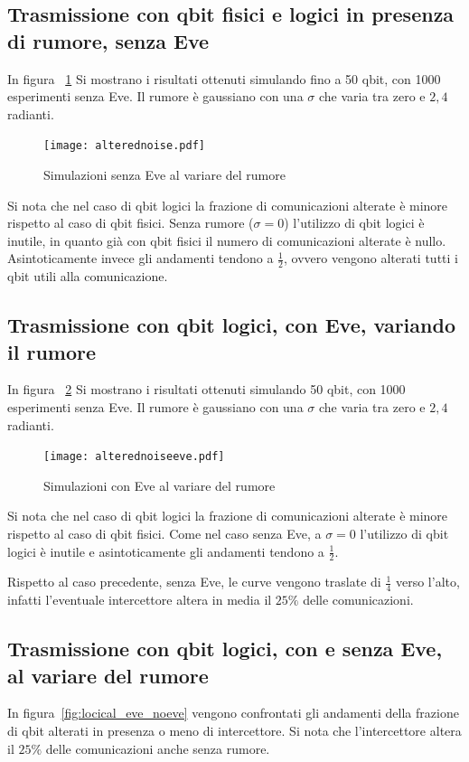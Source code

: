 \documentclass[11 pt, a4paper]{article}
\begin{document}
\clearpage
\subsection{Trasmissione con qbit fisici e logici in presenza di rumore, senza Eve}

In figura ~\ref{fig:alteredvsnoise} Si mostrano i risultati ottenuti simulando fino a 50 qbit, con 1000 esperimenti senza Eve.
Il rumore è gaussiano con una $\sigma$ che varia tra zero e $2,4$ radianti.

\begin{figure}[htb!]
\centering
\texttt{[image: alterednoise.pdf]}
\caption{Simulazioni senza Eve al variare del rumore}
\label{fig:alteredvsnoise}
\end{figure}

Si nota che nel caso di qbit logici la frazione di comunicazioni alterate è minore rispetto al caso di qbit fisici.
Senza rumore ($\sigma=0$) l'utilizzo di qbit logici è inutile, in quanto già con qbit fisici il numero di comunicazioni alterate è nullo.
Asintoticamente invece gli andamenti tendono a $\frac{1}{2}$, ovvero vengono alterati tutti i qbit utili alla comunicazione.

\clearpage
\subsection{Trasmissione con qbit logici, con Eve, variando il rumore}
In figura ~\ref{fig:alteredvsnoiseeve} Si mostrano i risultati ottenuti simulando 50 qbit, con 1000 esperimenti senza Eve.
Il rumore è gaussiano con una $\sigma$ che varia tra zero e $2,4$ radianti.

\begin{figure}[htb!]
\centering
\texttt{[image: alterednoiseeve.pdf]}
\caption{Simulazioni con Eve al variare del rumore}
\label{fig:alteredvsnoiseeve}
\end{figure}

Si nota che nel caso di qbit logici la frazione di comunicazioni alterate è minore rispetto al caso di qbit fisici.
Come nel caso senza Eve, a $\sigma=0$ l'utilizzo di qbit logici è inutile e asintoticamente gli andamenti tendono a $\frac{1}{2}$.

Rispetto al caso precedente, senza Eve, le curve vengono traslate di $\frac{1}{4}$ verso l'alto, infatti l'eventuale intercettore altera in media il $25\%$ delle comunicazioni.

\newpage
\subsection{Trasmissione con qbit logici, con e senza Eve, al variare del rumore}
In figura~\ref{fig:locical_eve_noeve} vengono confrontati gli andamenti della frazione di qbit alterati in presenza o meno di intercettore. Si nota che l'intercettore altera il $25\%$ delle comunicazioni anche senza rumore.
\end{document}
